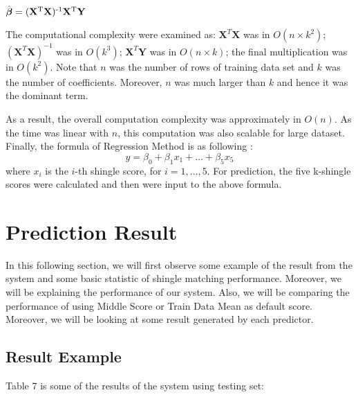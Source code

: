 \begin{center}
\(\hat{\boldsymbol{\beta}} = (\textbf{X} \textsuperscript{T} \textbf{X} ) \textsuperscript{-1} \textbf{X} \textsuperscript{T} \textbf{Y}  \) \\
\end{center}

The computational complexity were examined as: \(\textbf{X}^{T}\textbf{X}\) was in \(O(n \times k^2)\); \((\textbf{X}^{T}\textbf{X})^{-1}\) was in \(O(k^3)\);
\(\textbf{X}^T\textbf{Y}\) was in \(O(n\times k)\); the final multiplication was in \(O(k^2)\).
Note that \(n\) was the number of rows of training data set and \(k\) was the number of coefficients. Moreover, \(n\) was much larger than \(k\) and hence it was the dominant term.

As a result, the overall computation complexity was approximately in \(O(n)\).
As the time was linear with \(n\), this computation was also scalable for large dataset. Finally, the formula of Regression Method is as following : 
\begin{displaymath}
y = \beta_0  + \beta_1 x_1 + \dots + \beta_5 x_5
\end{displaymath}
where $x_i$ is the $i$-th shingle score, for $i=1,...,5$. For prediction, the five k-shingle scores were calculated and then were input to the above formula.

\section{Prediction Result}
In this following section, we will first observe some example of the result from the system and some basic statistic of shingle matching performance. Moreover, we will be explaining the performance of our system. Also, we will be comparing the performance of using Middle Score or Train Data Mean as default score. Moreover, we will be looking at some result generated by each predictor.


\subsection{Result Example}
Table 7 is some of the results of the system using testing set:

